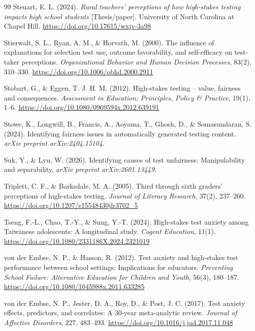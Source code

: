 \documentclass[11pt]{article}
\begin{document}
\begin{thebibliography}{99}
Steuart, E. L. (2024). \textit{Rural teachers' perceptions of how high-stakes testing impacts high school students} [Thesis/paper]. University of North Carolina at Chapel Hill. \url{https://doi.org/10.17615/wxjv-3a98}

Stierwalt, S. L., Ryan, A. M., \& Horvath, M. (2000). The influence of explanations for selection test use, outcome favorability, and self-efficacy on test-taker perceptions. \textit{Organizational Behavior and Human Decision Processes}, 83(2), 310--330. \url{https://doi.org/10.1006/obhd.2000.2911}

Stobart, G., \& Eggen, T. J. H. M. (2012). High-stakes testing -- value, fairness and consequences. \textit{Assessment in Education: Principles, Policy \& Practice}, 19(1), 1--6. \url{https://doi.org/10.1080/0969594x.2012.639191}

Stowe, K., Longwill, B., Francis, A., Aoyama, T., Ghosh, D., \& Somasundaran, S. (2024). Identifying fairness issues in automatically generated testing content. \textit{arXiv preprint arXiv:2404.15104}.

Suk, Y., \& Lyu, W. (2026). Identifying causes of test unfairness: Manipulability and separability. \textit{arXiv preprint arXiv:2601.13449}.

Triplett, C. F., \& Barksdale, M. A. (2005). Third through sixth graders' perceptions of high-stakes testing. \textit{Journal of Literacy Research}, 37(2), 237--260. \url{https://doi.org/10.1207/s15548430jlr3702_5}

Tseng, F.-L., Chao, T.-Y., \& Sung, Y.-T. (2024). High-stakes test anxiety among Taiwanese adolescents: A longitudinal study. \textit{Cogent Education}, 11(1). \url{https://doi.org/10.1080/2331186X.2024.2321019}

von der Embse, N. P., \& Hasson, R. (2012). Test anxiety and high-stakes test performance between school settings: Implications for educators. \textit{Preventing School Failure: Alternative Education for Children and Youth}, 56(3), 180--187. \url{https://doi.org/10.1080/1045988x.2011.633285}

von der Embse, N. P., Jester, D. A., Roy, D., \& Post, J. C. (2017). Test anxiety effects, predictors, and correlates: A 30-year meta-analytic review. \textit{Journal of Affective Disorders}, 227, 483--493. \url{https://doi.org/10.1016/j.jad.2017.11.048}


\end{thebibliography}
\end{document}
